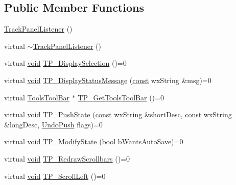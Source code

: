 \subsection*{Public Member Functions}
\begin{DoxyCompactItemize}
\item 
\hyperlink{class_track_panel_listener_a4ae0f181abdd0efac4e3416d8a6e1f28}{Track\+Panel\+Listener} ()
\item 
virtual \hyperlink{class_track_panel_listener_aed4a3223121e7cbb6fdb686fe704c760}{$\sim$\+Track\+Panel\+Listener} ()
\item 
virtual \hyperlink{sound_8c_ae35f5844602719cf66324f4de2a658b3}{void} \hyperlink{class_track_panel_listener_a0b1bc670fc99074c6a300e7165b4b997}{T\+P\+\_\+\+Display\+Selection} ()=0
\item 
virtual \hyperlink{sound_8c_ae35f5844602719cf66324f4de2a658b3}{void} \hyperlink{class_track_panel_listener_a314b71fdc6da3866223ae7351786c18d}{T\+P\+\_\+\+Display\+Status\+Message} (\hyperlink{getopt1_8c_a2c212835823e3c54a8ab6d95c652660e}{const} wx\+String \&msg)=0
\item 
virtual \hyperlink{class_tools_tool_bar}{Tools\+Tool\+Bar} $\ast$ \hyperlink{class_track_panel_listener_acf3d6b30e8eefb02d6524223a1e70545}{T\+P\+\_\+\+Get\+Tools\+Tool\+Bar} ()=0
\item 
virtual \hyperlink{sound_8c_ae35f5844602719cf66324f4de2a658b3}{void} \hyperlink{class_track_panel_listener_a6521874a9bd4ea7e9421fdbbbd9b1662}{T\+P\+\_\+\+Push\+State} (\hyperlink{getopt1_8c_a2c212835823e3c54a8ab6d95c652660e}{const} wx\+String \&short\+Desc, \hyperlink{getopt1_8c_a2c212835823e3c54a8ab6d95c652660e}{const} wx\+String \&long\+Desc, \hyperlink{_undo_manager_8h_a4df60e74fafdd06fb39cd12db3388114}{Undo\+Push} flags)=0
\item 
virtual \hyperlink{sound_8c_ae35f5844602719cf66324f4de2a658b3}{void} \hyperlink{class_track_panel_listener_ace0960ab8be8fde5e4f133a45b6b016f}{T\+P\+\_\+\+Modify\+State} (\hyperlink{mac_2config_2i386_2lib-src_2libsoxr_2soxr-config_8h_abb452686968e48b67397da5f97445f5b}{bool} b\+Wants\+Auto\+Save)=0
\item 
virtual \hyperlink{sound_8c_ae35f5844602719cf66324f4de2a658b3}{void} \hyperlink{class_track_panel_listener_ac48ce73b3c15b138c757460e701a61c7}{T\+P\+\_\+\+Redraw\+Scrollbars} ()=0
\item 
virtual \hyperlink{sound_8c_ae35f5844602719cf66324f4de2a658b3}{void} \hyperlink{class_track_panel_listener_a61ff8716044b54ab0dcc3e4bad15d05b}{T\+P\+\_\+\+Scroll\+Left} ()=0

\end{DoxyCompactItemize}
